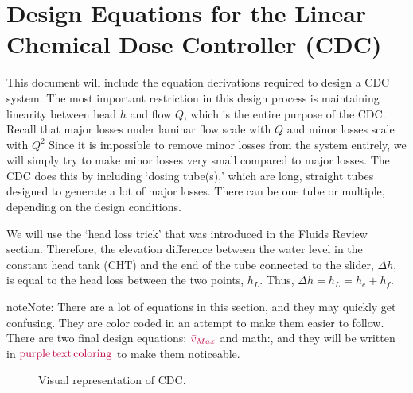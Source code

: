 \documentclass[letterpaper,10pt,english]{sphinxmanual}
\let\sphinxpxdimen\pdfpxdimen\else\newdimen\sphinxpxdimen
\begin{document}
\section{Design Equations for the Linear Chemical Dose Controller (CDC)}
\label{\detokenize{Flow_Control_and_Measurement/FCM_Derivations:design-equations-for-the-linear-chemical-dose-controller-cdc}}\label{\detokenize{Flow_Control_and_Measurement/FCM_Derivations:design-equations-for-the-cdc}}
This document will include the equation derivations required to design a CDC system. The most important restriction in this design process is maintaining linearity between head \(h\) and flow \(Q\), which is the entire purpose of the CDC. Recall that major losses under laminar flow scale with \(Q\) and minor losses scale with \(Q^2\) Since it is impossible to remove minor losses from the system entirely, we will simply try to make minor losses very small compared to major losses. The CDC does this by including ‘dosing tube(s),’ which are long, straight tubes designed to generate a lot of major losses. There can be one tube or multiple, depending on the design conditions.

We will use the ‘head loss trick’ that was introduced in the Fluids Review section. Therefore, the elevation difference between the water level in the constant head tank (CHT) and the end of the tube connected to the slider, \(\Delta h\), is equal to the head loss between the two points, \(h_L\). Thus, \(\Delta h = h_L = h_e + h_f\).

\begin{sphinxadmonition}{note}{Note:}
There are a lot of equations in this section, and they may quickly get confusing. They are color coded in an attempt to make them easier to follow. There are two final design equations: \(\color{purple}{\bar v_{Max}}\) and math:, and they will be written in \(\color{purple}{\rm{purple \, text \, coloring}}\) to make them noticeable.
\end{sphinxadmonition}

\begin{figure}[htbp]
\centering
\capstart

\noindent\sphinxincludegraphics[width=600\sphinxpxdimen]{{CDC_derivation}.png}
\caption{Visual representation of CDC.}\label{\detokenize{Flow_Control_and_Measurement/FCM_Derivations:id5}}\label{\detokenize{Flow_Control_and_Measurement/FCM_Derivations:cdc-derivation}}\end{figure}
\end{document}
